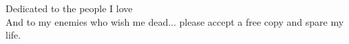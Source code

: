 \vspace*{1.5in}
Dedicated to the people I love \\

And to my enemies who wish me dead... please accept a free copy and spare my life.


